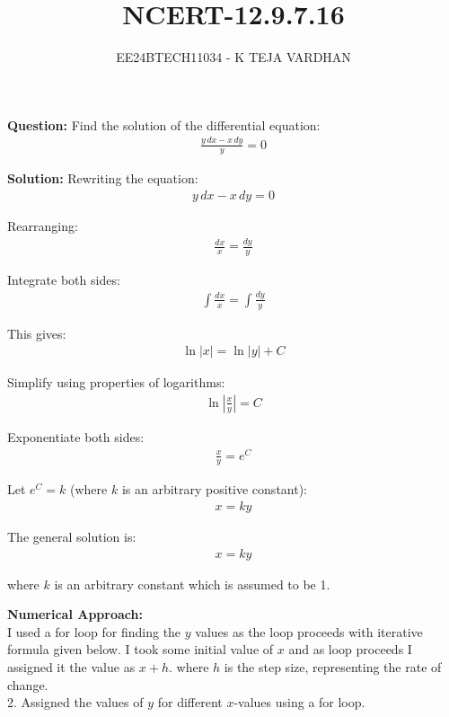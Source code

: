 \documentclass[article]{IEEEtran}
\numberwithin{figure}{enumi}
\begin{document}

\title{NCERT-12.9.7.16}
\author{EE24BTECH11034 - K TEJA VARDHAN}
{\let\newpage\relax\maketitle}

\noindent\textbf{Question: }  
Find the solution of the differential equation:  
\begin{align}
\frac{y \, dx - x \, dy}{y} = 0
\end{align}

\noindent\textbf{Solution:}  
Rewriting the equation:  
\begin{align}
    y \, dx - x \, dy = 0
\end{align}

\noindent Rearranging:
\begin{align}
    \frac{dx}{x} = \frac{dy}{y}
\end{align}

\noindent Integrate both sides:
\begin{align}
    \int \frac{dx}{x} = \int \frac{dy}{y}
\end{align}

\noindent This gives:
\begin{align}
    \ln|x| = \ln|y| + C
\end{align}

\noindent Simplify using properties of logarithms:
\begin{align}
    \ln\left|\frac{x}{y}\right| = C
\end{align}

\noindent Exponentiate both sides:
\begin{align}
    \frac{x}{y} = e^{C}
\end{align}

\noindent Let \( e^{C} = k \) (where \( k \) is an arbitrary positive constant):
\begin{align}
    x = k y
\end{align}

\noindent The general solution is:
\begin{align}
    \boxed{x = k y}
\end{align}

\noindent where \( k \) is an arbitrary constant which is assumed to be 1.

\vspace{0.5em}

\noindent\textbf{Numerical Approach:}\\ I used a for loop for finding the $y$ values as the loop proceeds with iterative formula given below. I took some initial value of $x$ and as loop proceeds I assigned it the value as $x+h$. where $h$ is the step size, representing the rate of change. 
\\2. Assigned the values of $y$ for different $x$-values using a for loop.  
\end{document}
